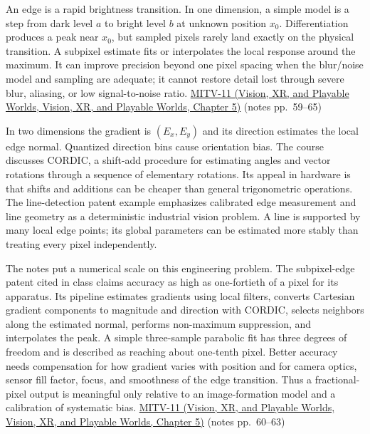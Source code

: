 An edge is a rapid brightness transition. In one dimension, a simple model is a step from dark level \(a\) to bright level \(b\) at unknown position \(x_0\). Differentiation produces a peak near \(x_0\), but sampled pixels rarely land exactly on the physical transition. A subpixel estimate fits or interpolates the local response around the maximum. It can improve precision beyond one pixel spacing when the blur/noise model and sampling are adequate; it cannot restore detail lost through severe blur, aliasing, or low signal-to-noise ratio. \href{../07-Vision-XR-and-Playable-Worlds/main.pdf\#nameddest=04-visual-computing-ii-ch036-mitv-11---edge-detection-subpixel-position-cordic-line-detection-us-6408109}{MITV-11 (Vision, XR, and Playable Worlds, Vision, XR, and Playable Worlds, Chapter 5)} (notes pp.~59--65)

In two dimensions the gradient is \((E_x,E_y)\) and its direction estimates the local edge normal. Quantized direction bins cause orientation bias. The course discusses CORDIC, a shift-add procedure for estimating angles and vector rotations through a sequence of elementary rotations. Its appeal in hardware is that shifts and additions can be cheaper than general trigonometric operations. The line-detection patent example emphasizes calibrated edge measurement and line geometry as a deterministic industrial vision problem. A line is supported by many local edge points; its global parameters can be estimated more stably than treating every pixel independently.

The notes put a numerical scale on this engineering problem. The subpixel-edge patent cited in class claims accuracy as high as one-fortieth of a pixel for its apparatus. Its pipeline estimates gradients using local filters, converts Cartesian gradient components to magnitude and direction with CORDIC, selects neighbors along the estimated normal, performs non-maximum suppression, and interpolates the peak. A simple three-sample parabolic fit has three degrees of freedom and is described as reaching about one-tenth pixel. Better accuracy needs compensation for how gradient varies with position and for camera optics, sensor fill factor, focus, and smoothness of the edge transition. Thus a fractional-pixel output is meaningful only relative to an image-formation model and a calibration of systematic bias. \href{../07-Vision-XR-and-Playable-Worlds/main.pdf\#nameddest=04-visual-computing-ii-ch036-mitv-11---edge-detection-subpixel-position-cordic-line-detection-us-6408109}{MITV-11 (Vision, XR, and Playable Worlds, Vision, XR, and Playable Worlds, Chapter 5)} (notes pp.~60--63)

